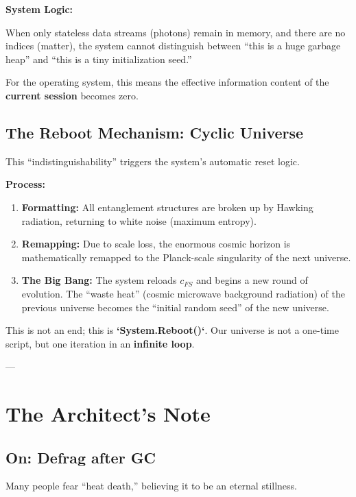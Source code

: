 \documentclass[11pt,a4paper,twoside]{book}
\begin{document}
\textbf{System Logic:}

When only stateless data streams (photons) remain in memory, and there are no indices (matter), the system cannot distinguish between ``this is a huge garbage heap'' and ``this is a tiny initialization seed.''

For the operating system, this means the effective information content of the \textbf{current session} becomes zero.

\subsection{The Reboot Mechanism: Cyclic Universe}

This ``indistinguishability'' triggers the system's automatic reset logic.

\textbf{Process:}

\begin{enumerate}
\item \textbf{Formatting:} All entanglement structures are broken up by Hawking radiation, returning to white noise (maximum entropy).

\item \textbf{Remapping:} Due to scale loss, the enormous cosmic horizon is mathematically remapped to the Planck-scale singularity of the next universe.

\item \textbf{The Big Bang:} The system reloads \textbf{$c_{FS}$} and begins a new round of evolution. The ``waste heat'' (cosmic microwave background radiation) of the previous universe becomes the ``initial random seed'' of the new universe.
\end{enumerate}

This is not an end; this is \textbf{`System.Reboot()`}. Our universe is not a one-time script, but one iteration in an \textbf{infinite loop}.

---

\section{The Architect's Note}

\subsection{On: Defrag after GC}

Many people fear ``heat death,'' believing it to be an eternal stillness.
\end{document}
